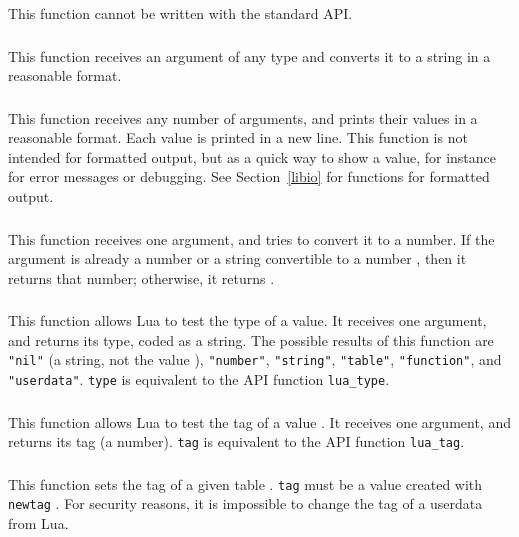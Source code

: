 This function cannot be written with the standard API.

\subsubsection*{\ff {}}
This function receives an argument of any type and
converts it to a string in a reasonable format.

\subsubsection*{\ff {}}
This function receives any number of arguments,
and prints their values in a reasonable format.
Each value is printed in a new line.
This function is not intended for formatted output,
but as a quick way to show a value,
for instance for error messages or debugging.
See Section~\ref{libio} for functions for formatted output.

\subsubsection*{\ff {}}
This function receives one argument,
and tries to convert it to a number.
If the argument is already a number or a string convertible
to a number , then it returns that number;
otherwise, it returns \nil.

\subsubsection*{\ff {}}\label{pdf-type}
This function allows Lua to test the type of a value.
It receives one argument, and returns its type, coded as a string.
The possible results of this function are
\verb|"nil"| (a string, not the value \nil),
\verb|"number"|,
\verb|"string"|,
\verb|"table"|,
\verb|"function"|,
and \verb|"userdata"|.
\verb|type| is equivalent to the API function \verb|lua_type|.

\subsubsection*{\ff {}}
This function allows Lua to test the tag of a value .
It receives one argument, and returns its tag (a number).
\verb|tag| is equivalent to the API function \verb|lua_tag|.

\subsubsection*{\ff {}}
This function sets the tag of a given table .
\verb|tag| must be a value created with \verb|newtag|
.
For security reasons,
it is impossible to change the tag of a userdata from Lua.

